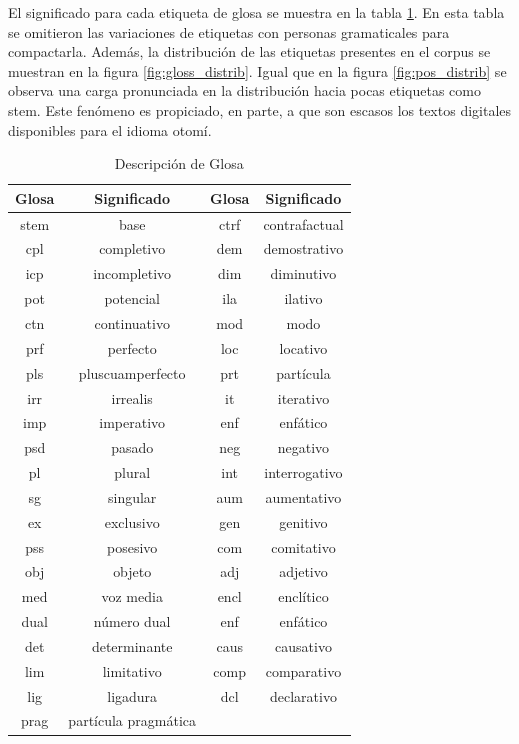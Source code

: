\documentclass[letterpaper,12pt,oneside]{book}
\theoremstyle{definition}
\begin{document}
El significado para cada etiqueta de glosa se muestra en la tabla \ref{table:gloss_desc}. En esta tabla se omitieron las variaciones de etiquetas con personas gramaticales para compactarla. Además, la distribución de las etiquetas presentes en el corpus se muestran en la figura \ref{fig:gloss_distrib}. Igual que en la figura \ref{fig:pos_distrib} se observa una carga pronunciada en la distribución hacia pocas etiquetas como \textsf{stem}. Este fenómeno es propiciado, en parte, a que son escasos los textos digitales disponibles para el idioma otomí.

\begin{table}
	\centering
	\begin{tabular}{| c  c | c  c |} \hline
		\textbf{Glosa} & \textbf{Significado} & \textbf{Glosa} & \textbf{Significado}\\\hline
		stem & base & ctrf & contrafactual \\
        cpl & completivo & dem & demostrativo \\
        icp & incompletivo & dim & diminutivo \\
        pot & potencial & ila & ilativo \\
        ctn & continuativo & mod & modo \\
        prf & perfecto & loc & locativo \\
        pls & pluscuamperfecto & prt & partícula \\
        irr & irrealis & it & iterativo \\
        imp & imperativo & enf & enfático \\
        psd & pasado & neg & negativo \\
        pl & plural & int & interrogativo \\
        sg & singular & aum & aumentativo \\
        ex & exclusivo & gen & genitivo \\
        pss & posesivo & com & comitativo \\
        obj & objeto & adj & adjetivo \\
        med & voz media & encl & enclítico \\
        dual & número dual & enf & enfático \\
        det & determinante & caus & causativo \\
        lim & limitativo & comp & comparativo \\
        lig & ligadura & dcl & declarativo \\
        prag & partícula pragmática & \\ \hline
	\end{tabular}
	\caption{Descripción de Glosa}
	\label{table:gloss_desc}
\end{table}
	
\end{document}
